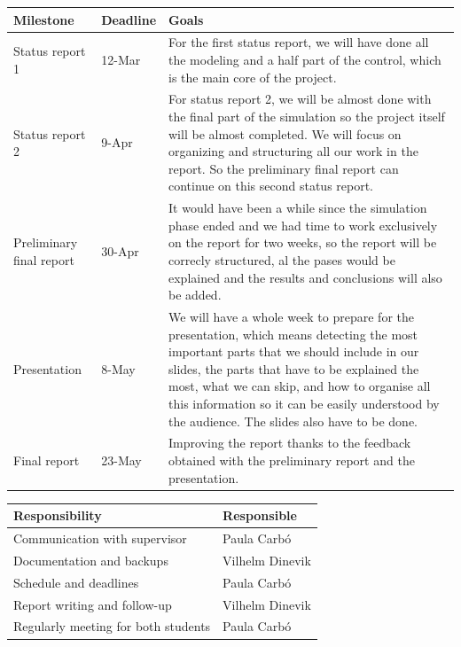 \documentclass{article}
\begin{document}
		\begin{center}	
			\bigskip
			\begin{tabular}{|C{3cm}|C{3cm}|C{8.5cm}|} \hline
				Milestone & Deadline & Goals \\ \hline
				Status report 1 & 12-Mar & For the first status report, we will have done all the modeling and a half part of the control, which is the main core of the project.\\ \hline
				Status report 2 & 9-Apr & For status report 2, we will be almost done with the final part of the simulation so the project itself will be almost completed. We will focus on organizing and structuring all our work in the report. So the preliminary final report can continue on this second status report. \\ \hline
				Preliminary final report & 30-Apr & It would have been a while since the simulation phase ended and we had time to work exclusively on the report for two weeks, so the report will be correcly structured, al the pases would be explained and the results and conclusions will also be added.\\ \hline
				Presentation & 8-May & We will have a whole week to prepare for the presentation, which means detecting the most important parts that we should include in our slides, the parts that have to be explained the most, what we can skip, and how to organise all this information so it can be easily understood by the audience. The slides also have to be done.\\ \hline
				Final report & 23-May & Improving the report thanks to the feedback obtained with the preliminary report and the presentation.\\ \hline
			\end{tabular}
		
			\vspace{3em}
			\begin{tabular}{|C{6cm}|C{4cm}|} \hline
				Responsibility & Responsible \\ \hline
				Communication with supervisor & Paula Carbó \\ \hline
				Documentation and backups & Vilhelm Dinevik \\ \hline
				Schedule and deadlines & Paula Carbó \\ \hline
				Report writing and follow-up & Vilhelm Dinevik \\ \hline
				Regularly meeting for both students & Paula Carbó \\ \hline
			\end{tabular}
		\end{center}
	
\end{document}
